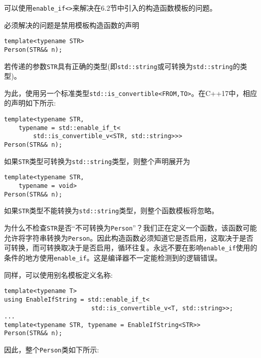 可以使用\texttt{enable\_if<>}来解决在6.2节中引入的构造函数模板的问题。

必须解决的问题是禁用模板构造函数的声明

\begin{lstlisting}[style=styleCXX]
template<typename STR>
Person(STR&& n);
\end{lstlisting}

若传递的参数\texttt{STR}具有正确的类型(即\texttt{std::string}或可转换为\texttt{std::string}的类型)。

为此，使用另一个标准类型\texttt{std::is\_convertible<FROM,TO>}。在C++17中，相应的声明如下所示:

\begin{lstlisting}[style=styleCXX]
template<typename STR,
	typename = std::enable_if_t<
		std::is_convertible_v<STR, std::string>>>
Person(STR&& n);
\end{lstlisting}

如果\texttt{STR}类型可转换为\texttt{std::string}类型，则整个声明展开为

\begin{lstlisting}[style=styleCXX]
template<typename STR,
	typename = void>
Person(STR&& n);
\end{lstlisting}

如果\texttt{STR}类型不能转换为\texttt{std::string}类型，则整个函数模板将忽略。

\begin{tcolorbox}[colback=webgreen!5!white,colframe=webgreen!75!black]
\hspace*{0.75cm}为什么不检查\texttt{STR}是否“不可转换为\texttt{Person}”？我们正在定义一个函数，该函数可能允许将字符串转换为\texttt{Person}。因此构造函数必须知道它是否启用，这取决于是否可转换，而可转换取决于是否启用，循环往复。永远不要在影响\texttt{enable\_if}使用的条件的地方使用\texttt{enable\_if}。这是编译器不一定能检测到的逻辑错误。
\end{tcolorbox}

同样，可以使用别名模板定义名称:

\begin{lstlisting}[style=styleCXX]
template<typename T>
using EnableIfString = std::enable_if_t<
						std::is_convertible_v<T, std::string>>;
...
template<typename STR, typename = EnableIfString<STR>>
Person(STR&& n);
\end{lstlisting}

因此，整个\texttt{Person}类如下所示:

